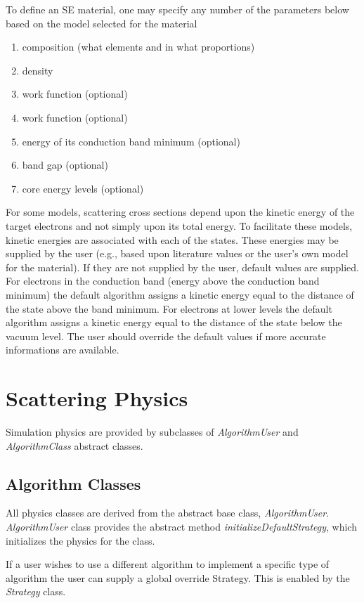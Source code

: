 To define an SE material, one may specify any number of the parameters below based on the model selected for the material
\begin{enumerate}
\item composition (what elements and in what proportions)
\item density
\item work function (optional)
\item work function (optional)
\item energy of its conduction band minimum (optional)
\item band gap (optional)
\item core energy levels (optional)
\end{enumerate}

For some models, scattering cross sections depend upon the kinetic energy of the target electrons and not simply upon its total energy. To facilitate these models, kinetic energies are associated with each of the states. These energies may be supplied by the user (e.g., based upon literature values or the user's own model for the material). If they are not supplied by the user, default values are supplied. For electrons in the conduction band (energy above the conduction band minimum) the default algorithm assigns a kinetic energy equal to the distance of the state above the band minimum. For electrons at lower levels the default algorithm assigns a kinetic energy equal to the distance of the state below the vacuum level. The user should override the default values if more accurate informations are available. 

\section{Scattering Physics}
Simulation physics are provided by subclasses of \textit{AlgorithmUser} and \textit{AlgorithmClass} abstract classes.

\subsection{Algorithm Classes}
All physics classes are derived from the abstract base class, \textit{AlgorithmUser}. \textit{AlgorithmUser} class provides the abstract method \textit{initializeDefaultStrategy}, which initializes the physics for the class. 

If a user wishes to use a different algorithm to implement a specific type of algorithm the user can supply a global override Strategy. This is enabled by the \textit{Strategy} class.

